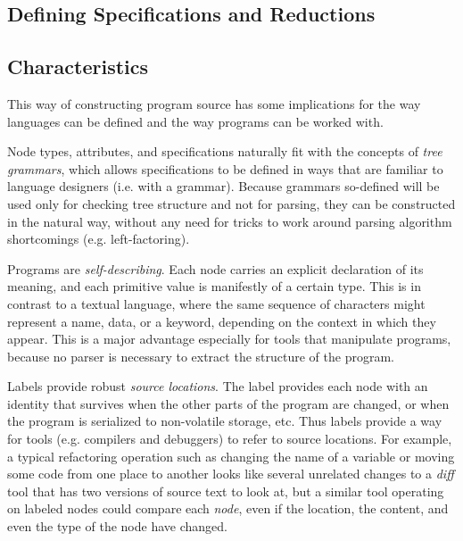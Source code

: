 
\subsection{Defining Specifications and Reductions}



\subsection{Characteristics}
This way of constructing program source has some implications for the way languages can be defined and the way programs can be worked with.

Node types, attributes, and specifications naturally fit with the concepts of \emph{tree grammars}, which allows specifications to be defined in ways that are familiar to language designers (i.e. with a grammar). Because grammars so-defined will be used only for checking tree structure and not for parsing, they can be constructed in the natural way, without any need for tricks to work around parsing algorithm shortcomings (e.g. left-factoring).

Programs are \emph{self-describing}. Each node carries an explicit declaration of its meaning, and each primitive value is manifestly of a certain type. This is in contrast to a textual language, where the same sequence of characters might represent a name, data, or a keyword, depending on the context in which they appear. This is a major advantage especially for tools that manipulate programs, because no parser is necessary to extract the structure of the program.

Labels provide robust \emph{source locations}. The label provides each node with an identity that survives when the other parts of the program are changed, or when the program is serialized to non-volatile storage, etc. Thus labels provide a way for tools (e.g. compilers and debuggers) to refer to source locations. For example, a typical refactoring operation such as changing the name of a variable or moving some code from one place to another looks like several unrelated changes to a \emph{diff} tool that has two versions of source text to look at, but a similar tool operating on labeled nodes could compare each \emph{node}, even if the location, the content, and even the type of the node have changed.

